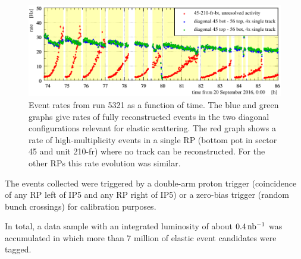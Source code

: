 \begin{figure}
\begin{center}
\includegraphics{fig/rates_vs_time.pdf}
\caption{%
Event rates from run 5321 as a function of time. The blue and green graphs give rates of fully reconstructed events in the two diagonal configurations relevant for elastic scattering. The red graph shows a rate of high-multiplicity events in a single RP (bottom pot in sector 45 and unit 210-fr) where no track can be reconstructed. For the other RPs this rate evolution was similar.
}
\label{fig:rates_vs_time}
\end{center}
\end{figure}

The events collected were triggered by a double-arm proton trigger (coincidence of any RP left of IP5 and any RP right of IP5) or a zero-bias trigger (random bunch crossings) for calibration purposes.

In total, a data sample with an integrated luminosity of about $0.4\,\rm nb^{-1}$ was accumulated in which more than 7 million of elastic event candidates were tagged.
